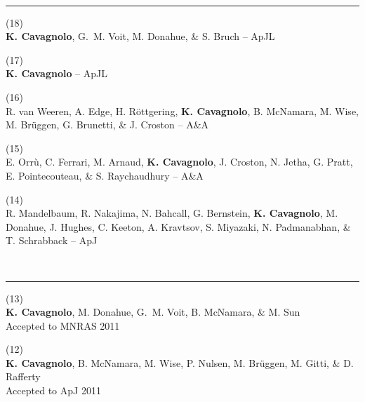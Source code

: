 \documentclass[12pt]{cv}
\begin{document}
\begin{center}
{\Large{}}\vspace{-0.3cm}
\normalsize
\end{center}

{\large{}}\vspace{-0.3cm}\\
\rule{\linewidth}{0.5pt}
(18) {}\\
{\bf K. Cavagnolo}, G.~M. Voit, M. Donahue, \& S. Bruch -- 
ApJL

(17) {}\\
{\bf K. Cavagnolo} -- 
ApJL

(16) {}\\
R. van Weeren, A. Edge, H. R\"ottgering, {\bf{K. Cavagnolo}}, B. McNamara, M. Wise, M. Br\"uggen, G. Brunetti, \& J. Croston -- 
A\&A

(15) {}\\
E. Orr\`u, C. Ferrari, M. Arnaud, {\bf K. Cavagnolo}, J. Croston, N. Jetha, G. Pratt, E. Pointecouteau, \& S. Raychaudhury -- 
A\&A

(14) {}\\
R. Mandelbaum, R. Nakajima, N. Bahcall, G. Bernstein, {\bf K. Cavagnolo}, M. Donahue, J. Hughes, C. Keeton, A. Kravtsov, S. Miyazaki, N. Padmanabhan, \& T. Schrabback -- 
ApJ

{\large{}}\vspace{-0.3cm}\\
\rule{\linewidth}{0.5pt}
(13) {}\\
{\bf K. Cavagnolo}, M. Donahue, G.~M. Voit, B. McNamara, \& M. Sun\\
Accepted to MNRAS 2011

(12) {}\\
{\bf K. Cavagnolo}, B. McNamara, M. Wise, P. Nulsen, M. Br\"uggen, M. Gitti, \& D. Rafferty\\ 
Accepted to ApJ 2011
\end{document}

